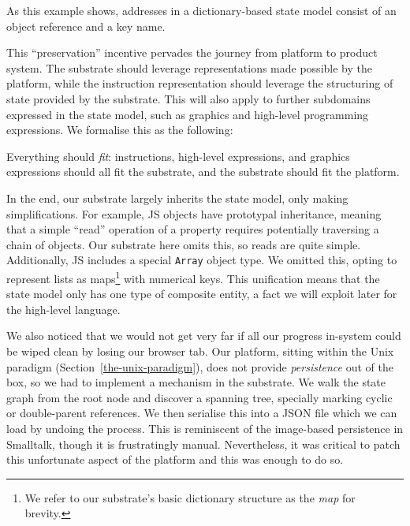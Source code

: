 \documentclass[ twoside,openright,titlepage,numbers=noenddot,headinclude,footinclude,cleardoublepage=empty,abstract=on,
                BCOR=5mm,paper=a4,fontsize=11pt
                ]{scrreprt}
\newcommand{\eg}{e.\,g.}
\newcommand{\joel}[1]{}
\theoremstyle{definition}
\begin{document}
As this example shows, addresses in a dictionary-based state model
consist of an object reference and a key name.

This ``preservation'' incentive pervades the journey from platform to
product system. The substrate should leverage representations made
possible by the platform, while the instruction representation should
leverage the structuring of state provided by the substrate. This will
also apply to further subdomains expressed in the state model, such as
graphics and high-level programming expressions. We formalise this as
the following:

\begin{force}[Alignment]
\label{alignment}
Everything should \emph{fit}: instructions, high-level expressions, and graphics expressions should all fit the substrate, and the substrate should fit the platform.
\joel{Violation \eg{} flat array as state via JS, fails to preserve a feature. Ideally, this force propagates all features from A to B.}
\joel{Call this "preservation"?}
\end{force}

In the end, our substrate largely inherits the state model, only making
simplifications. For example, \ac{JS} objects have prototypal
inheritance, meaning that a simple ``read'' operation of a property
requires potentially traversing a chain of objects. Our substrate here
omits this, so reads are quite simple. Additionally, \ac{JS} includes a
special \texttt{Array} object type. We omitted this, opting to represent
lists as maps\footnote{We refer to our substrate's basic dictionary
  structure as the \emph{map} for brevity.} with numerical keys. This
unification means that the state model only has one type of composite
entity, a fact we will exploit later for the high-level language.

We also noticed that we would not get very far if all our progress
in-system could be wiped clean by losing our browser tab. Our platform,
sitting within the Unix paradigm (Section~\ref{the-unix-paradigm}), does
not provide \emph{persistence} out of the box, so we had to implement a
mechanism in the substrate. We walk the state graph from the root node
and discover a spanning tree, specially marking cyclic or double-parent
references. We then serialise this into a JSON file which we can load by
undoing the process. This is reminiscent of the image-based persistence
in Smalltalk, though it is frustratingly manual. Nevertheless, it was
critical to patch this unfortunate aspect of the platform and this was
enough to do so.
\end{document}
